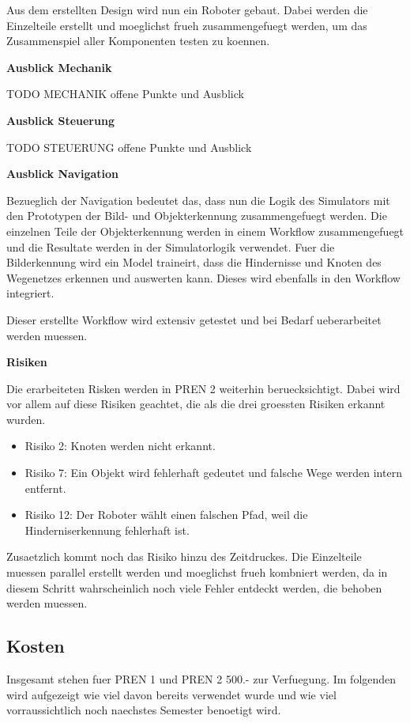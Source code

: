 Aus dem erstellten Design wird nun ein Roboter gebaut. Dabei werden die Einzelteile erstellt und moeglichst frueh zusammengefuegt werden, um das Zusammenspiel aller Komponenten testen zu koennen.

\textbf{Ausblick Mechanik}

TODO MECHANIK offene Punkte und Ausblick

\textbf{Ausblick Steuerung}

TODO STEUERUNG offene Punkte und Ausblick

\textbf{Ausblick Navigation}

Bezueglich der Navigation bedeutet das, dass nun die Logik des Simulators mit den Prototypen der Bild- und Objekterkennung zusammengefuegt werden. Die einzelnen Teile der Objekterkennung werden in einem Workflow zusammengefuegt und die Resultate werden in der Simulatorlogik verwendet. Fuer die Bilderkennung wird ein Model traineirt, dass die Hindernisse und Knoten des Wegenetzes erkennen und auswerten kann. Dieses wird ebenfalls in den Workflow integriert.

Dieser erstellte Workflow wird extensiv getestet und bei Bedarf ueberarbeitet werden muessen.

\textbf{Risiken}

Die erarbeiteten Risken werden in PREN 2 weiterhin beruecksichtigt. Dabei wird vor allem auf diese Risiken geachtet, die als die drei groessten Risiken erkannt wurden.

\begin{itemize}
    \item Risiko 2: Knoten werden nicht erkannt.
    \item Risiko 7: Ein Objekt wird fehlerhaft gedeutet und falsche Wege werden intern entfernt.
    \item Risiko 12: Der Roboter wählt einen falschen Pfad, weil die Hinderniserkennung fehlerhaft ist.
\end{itemize}

Zusaetzlich kommt noch das Risiko hinzu des Zeitdruckes. Die Einzelteile muessen parallel erstellt werden und moeglichst frueh kombniert werden, da in diesem Schritt wahrscheinlich noch viele Fehler entdeckt werden, die behoben werden muessen. 

\subsection{Kosten}\label{kosten}

Insgesamt stehen fuer PREN 1 und PREN 2 500.- zur Verfuegung. Im folgenden wird aufgezeigt wie viel davon bereits verwendet wurde und wie viel vorraussichtlich noch naechstes Semester benoetigt wird.


